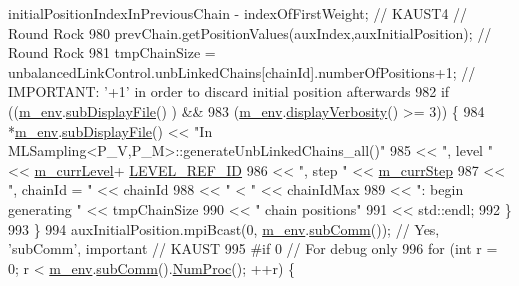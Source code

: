 \begin{DoxyCode}
      initialPositionIndexInPreviousChain - indexOfFirstWeight; \textcolor{comment}{// KAUST4 // Round Rock}
980       prevChain.getPositionValues(auxIndex,auxInitialPosition); \textcolor{comment}{// Round Rock}
981       tmpChainSize = unbalancedLinkControl.unbLinkedChains[chainId].numberOfPositions+1; \textcolor{comment}{// IMPORTANT: '+1'
       in order to discard initial position afterwards}
982       \textcolor{keywordflow}{if} ((\hyperlink{class_q_u_e_s_o_1_1_m_l_sampling_a13f1ca4fe9f94822fe572a743eaced1d}{m\_env}.\hyperlink{class_q_u_e_s_o_1_1_base_environment_a8a0064746ae8dddfece4229b9ad374d6}{subDisplayFile}()       ) &&
983           (\hyperlink{class_q_u_e_s_o_1_1_m_l_sampling_a13f1ca4fe9f94822fe572a743eaced1d}{m\_env}.\hyperlink{class_q_u_e_s_o_1_1_base_environment_a1fe5f244fc0316a0ab3e37463f108b96}{displayVerbosity}() >= 3)) \{
984         *\hyperlink{class_q_u_e_s_o_1_1_m_l_sampling_a13f1ca4fe9f94822fe572a743eaced1d}{m\_env}.\hyperlink{class_q_u_e_s_o_1_1_base_environment_a8a0064746ae8dddfece4229b9ad374d6}{subDisplayFile}() << \textcolor{stringliteral}{"In
       MLSampling<P\_V,P\_M>::generateUnbLinkedChains\_all()"}
985                                 << \textcolor{stringliteral}{", level "}            << \hyperlink{class_q_u_e_s_o_1_1_m_l_sampling_af9416874c856e50f3b35270e801f17e4}{m\_currLevel}+
      \hyperlink{_m_l_sampling_level_options_8h_a68d15eaf394d210effcf584b938206d3}{LEVEL\_REF\_ID}
986                                 << \textcolor{stringliteral}{", step "}             << \hyperlink{class_q_u_e_s_o_1_1_m_l_sampling_a1b1f8ccb4823bdfa26ec652f0807c63e}{m\_currStep}
987                                 << \textcolor{stringliteral}{", chainId = "}        << chainId
988                                 << \textcolor{stringliteral}{" < "}                 << chainIdMax
989                                 << \textcolor{stringliteral}{": begin generating "} << tmpChainSize
990                                 << \textcolor{stringliteral}{" chain positions"}
991                                 << std::endl;
992       \}
993     \}
994     auxInitialPosition.mpiBcast(0, \hyperlink{class_q_u_e_s_o_1_1_m_l_sampling_a13f1ca4fe9f94822fe572a743eaced1d}{m\_env}.\hyperlink{class_q_u_e_s_o_1_1_base_environment_affe39f53e3d5d678842413370af09145}{subComm}()); \textcolor{comment}{// Yes, 'subComm', important // KAUST}
995 \textcolor{preprocessor}{#if 0 // For debug only}
996 \textcolor{preprocessor}{}    \textcolor{keywordflow}{for} (\textcolor{keywordtype}{int} r = 0; r < \hyperlink{class_q_u_e_s_o_1_1_m_l_sampling_a13f1ca4fe9f94822fe572a743eaced1d}{m\_env}.\hyperlink{class_q_u_e_s_o_1_1_base_environment_affe39f53e3d5d678842413370af09145}{subComm}().\hyperlink{class_q_u_e_s_o_1_1_mpi_comm_aa780721ae0fdeabc5a15e04cb0cad964}{NumProc}(); ++r) \{

\end{DoxyCode}
